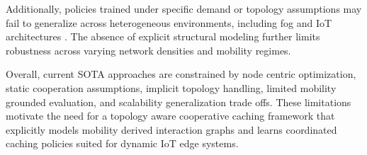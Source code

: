 Additionally, policies trained under specific demand or topology assumptions may fail to generalize across heterogeneous environments, including fog and IoT architectures \cite{Chiang2016Fog, Satyanarayanan2017Edge}. The absence of explicit structural modeling further limits robustness across varying network densities and mobility regimes.

\medskip

Overall, current SOTA approaches are constrained by node centric optimization, static cooperation assumptions, implicit topology handling, limited mobility grounded evaluation, and scalability generalization trade offs. These limitations motivate the need for a topology aware cooperative caching framework that explicitly models mobility derived interaction graphs and learns coordinated caching policies suited for dynamic IoT edge systems.
